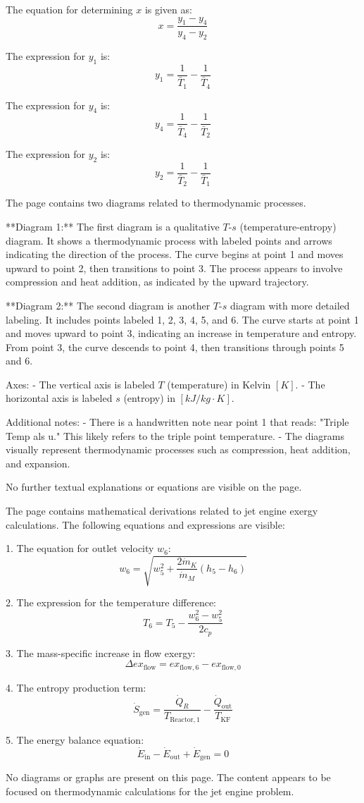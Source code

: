 The equation for determining \( x \) is given as:  
\[
x = \frac{y_1 - y_4}{y_4 - y_2}
\]  

The expression for \( y_1 \) is:  
\[
y_1 = \frac{1}{\bar{T}_1} - \frac{1}{\bar{T}_4}
\]  

The expression for \( y_4 \) is:  
\[
y_4 = \frac{1}{\bar{T}_4} - \frac{1}{\bar{T}_2}
\]  

The expression for \( y_2 \) is:  
\[
y_2 = \frac{1}{\bar{T}_2} - \frac{1}{\bar{T}_1}
\]

The page contains two diagrams related to thermodynamic processes.  

**Diagram 1:**  
The first diagram is a qualitative \( T \)-\( s \) (temperature-entropy) diagram. It shows a thermodynamic process with labeled points and arrows indicating the direction of the process. The curve begins at point 1 and moves upward to point 2, then transitions to point 3. The process appears to involve compression and heat addition, as indicated by the upward trajectory.  

**Diagram 2:**  
The second diagram is another \( T \)-\( s \) diagram with more detailed labeling. It includes points labeled 1, 2, 3, 4, 5, and 6. The curve starts at point 1 and moves upward to point 3, indicating an increase in temperature and entropy. From point 3, the curve descends to point 4, then transitions through points 5 and 6.  

Axes:  
- The vertical axis is labeled \( T \) (temperature) in Kelvin \([K]\).  
- The horizontal axis is labeled \( s \) (entropy) in \([kJ/kg·K]\).  

Additional notes:  
- There is a handwritten note near point 1 that reads: "Triple Temp als u." This likely refers to the triple point temperature.  
- The diagrams visually represent thermodynamic processes such as compression, heat addition, and expansion.  

No further textual explanations or equations are visible on the page.

The page contains mathematical derivations related to jet engine exergy calculations. The following equations and expressions are visible:

1. The equation for outlet velocity \( w_6 \):
\[
w_6 = \sqrt{w_5^2 + \frac{2 \dot{m}_K}{\dot{m}_M} \left( h_5 - h_6 \right)}
\]

2. The expression for the temperature difference:
\[
T_6 = T_5 - \frac{w_6^2 - w_5^2}{2 c_p}
\]

3. The mass-specific increase in flow exergy:
\[
\Delta ex_{\text{flow}} = ex_{\text{flow},6} - ex_{\text{flow},0}
\]

4. The entropy production term:
\[
\dot{S}_{\text{gen}} = \frac{\dot{Q}_R}{T_{\text{Reactor},1}} - \frac{\dot{Q}_{\text{out}}}{T_{\text{KF}}}
\]

5. The energy balance equation:
\[
\dot{E}_{\text{in}} - \dot{E}_{\text{out}} + \dot{E}_{\text{gen}} = 0
\]

No diagrams or graphs are present on this page. The content appears to be focused on thermodynamic calculations for the jet engine problem.
